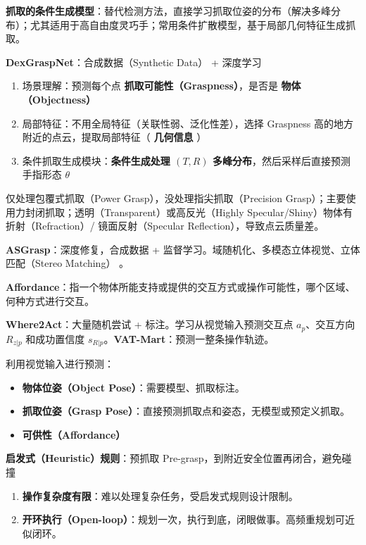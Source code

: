 \documentclass[
  8pt]{extarticle}
\providecommand{\tightlist}{%
  \setlength{\itemsep}{0pt}\setlength{\parskip}{0pt}}
\begin{document}
\begin{multicols*}{4}
\textbf{抓取的条件生成模型}：替代检测方法，直接学习抓取位姿的分布（解决多峰分布）；尤其适用于高自由度灵巧手；常用条件扩散模型，基于局部几何特征生成抓取。

\textbf{DexGraspNet}：合成数据（Synthetic Data） + 深度学习

\begin{enumerate}
\def\labelenumi{\arabic{enumi}.}
\tightlist
\item
  场景理解：预测每个点 \textbf{抓取可能性（Graspness）}，是否是
  \textbf{物体（Objectness）}
\item
  局部特征：不用全局特征（关联性弱、泛化性差），选择 Graspness
  高的地方附近的点云，提取局部特征（ \textbf{几何信息} ）
\item
  条件抓取生成模块：\textbf{条件生成处理 \((T, R)\)
  多峰分布}，然后采样后直接预测手指形态 \(\theta\)
\end{enumerate}

仅处理包覆式抓取（Power Grasp），没处理指尖抓取（Precision
Grasp）；主要使用力封闭抓取；透明（Transparent）或高反光（Highly
Specular/Shiny）物体有折射（Refraction）/ 镜面反射（Specular
Reflection），导致点云质量差。

\textbf{ASGrasp}：深度修复，合成数据 +
监督学习。域随机化、多模态立体视觉、立体匹配（Stereo Matching） 。

\textbf{Affordance}：指一个物体所能支持或提供的交互方式或操作可能性，哪个区域、何种方式进行交互。

\textbf{Where2Act}：大量随机尝试 + 标注。学习从视觉输入预测交互点
\(a_p\)、交互方向 \(R_{z|p}\) 和成功置信度
\(s_{R|p}\)。\textbf{VAT-Mart}：预测一整条操作轨迹。

利用视觉输入进行预测：

\begin{itemize}
\tightlist
\item
  \textbf{物体位姿（Object Pose）}：需要模型、抓取标注。
\item
  \textbf{抓取位姿（Grasp
  Pose）}：直接预测抓取点和姿态，无模型或预定义抓取。
\item
  \textbf{可供性（Affordance）}
\end{itemize}

\textbf{启发式（Heuristic）规则}：预抓取
Pre-grasp，到附近安全位置再闭合，避免碰撞

\begin{enumerate}
\def\labelenumi{\arabic{enumi}.}
\tightlist
\item
  \textbf{操作复杂度有限}：难以处理复杂任务，受启发式规则设计限制。
\item
  \textbf{开环执行（Open-loop）}：规划一次，执行到底，闭眼做事。高频重规划可近似闭环。
\end{enumerate}


\end{multicols*}
\end{document}
